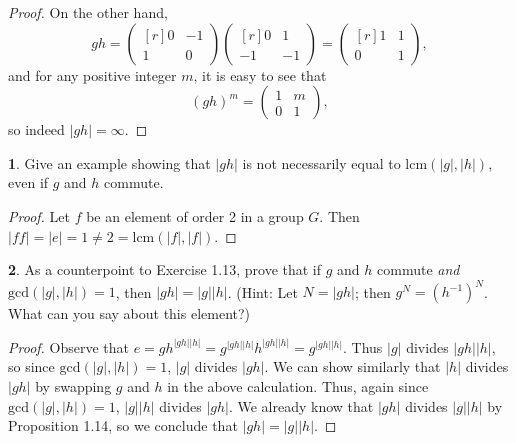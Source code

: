 \documentclass{article}
\theoremstyle{definition}
\newtheorem{ex}{}[section]
\begin{document}
\begin{proof}
	On the other hand, \begin{equation*}
		gh = \begin{pmatrix*}[r]
			0 & -1 \\
			1 & 0
		\end{pmatrix*}\begin{pmatrix*}[r]
			0 & 1 \\
			-1 & -1
		\end{pmatrix*} = \begin{pmatrix*}[r]
			1 & 1 \\
			0 & 1
		\end{pmatrix*},
	\end{equation*}
	and for any positive integer $m$, it is easy to see that \begin{equation*}
		(gh)^m = \begin{pmatrix*}
			1 & m \\
			0 & 1
		\end{pmatrix*},
	\end{equation*}
	so indeed $|gh| = \infty$.
\end{proof}

\begin{ex}
	Give an example showing that $|gh|$ is not necessarily equal to $\mathrm{lcm}(|g|, |h|)$, even if $g$ and $h$ commute.
\end{ex}
\begin{proof}
  Let $f$ be an element of order 2 in a group $G$.
  Then $|ff| = |e| = 1 \neq 2 = \mathrm{lcm}(|f|, |f|)$.
\end{proof}

\begin{ex}
  As a counterpoint to Exercise 1.13, prove that if $g$ and $h$ commute \textit{and} $\mathrm{gcd}(|g|, |h|) = 1$, then $|gh| = |g||h|$.
  (Hint: Let $N = |gh|$; then $g^N = (h^{-1})^N$. What can you say about this element?)
\end{ex}
\begin{proof}
  Observe that $e = gh^{|gh||h|} = g^{|gh||h|}h^{|gh||h|} = g^{|gh||h|}$.
  Thus $|g|$ divides $|gh||h|$, so since $\mathrm{gcd}(|g|, |h|) = 1$, $|g|$ divides $|gh|$.
  We can show similarly that $|h|$ divides $|gh|$ by swapping $g$ and $h$ in the above calculation.
  Thus, again since $\mathrm{gcd}(|g|, |h|) = 1$, $|g||h|$ divides $|gh|$.
  We already know that $|gh|$ divides $|g||h|$ by Proposition 1.14, so we conclude that $|gh| = |g||h|$.
\end{proof}
\end{document}
